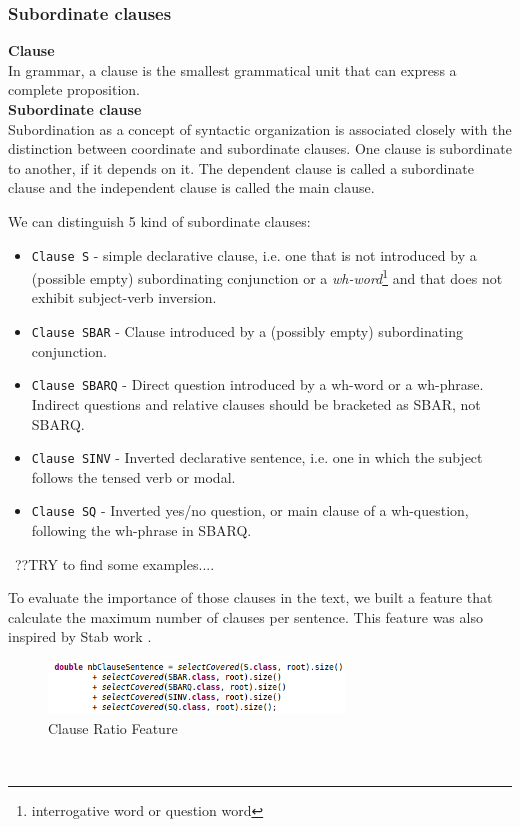 \subsubsection{Subordinate clauses}
\textbf{Clause}
\\
In grammar, a clause is the smallest grammatical unit that can express a complete proposition. 
\\
\textbf{Subordinate clause}
\\
Subordination as a concept of syntactic organization is associated closely with the distinction between coordinate and subordinate clauses. One clause is subordinate to another, if it depends on it. The dependent clause is called a subordinate clause and the independent clause is called the main clause.

We can distinguish 5 kind of subordinate clauses:
\begin{itemize}
  \item \texttt{Clause S} - simple declarative clause, i.e. one that is not introduced by a (possible empty) subordinating conjunction or a \emph{wh-word}\footnote{interrogative word or question word} and that does not exhibit subject-verb inversion.
  \item \texttt{Clause SBAR} - Clause introduced by a (possibly empty) subordinating conjunction.
  \item \texttt{Clause SBARQ} - Direct question introduced by a wh-word or a wh-phrase. Indirect questions and relative clauses should be bracketed as SBAR, not SBARQ.
  \item \texttt{Clause SINV} - Inverted declarative sentence, i.e. one in which the subject follows the tensed verb or modal. 
  \item \texttt{Clause SQ} - Inverted yes/no question, or main clause of a wh-question, following the wh-phrase in SBARQ.
\end{itemize} 
\
??TRY to find some examples....

To evaluate the importance of those clauses in the text, we built a feature that calculate the maximum number of clauses per sentence. This feature was also inspired by Stab work \cite{TUD-CS-2014-0882}.
\
\begin{figure}[H]
    \centering
    \includegraphics[width=0.7\textwidth]{fig/subclause.png}
    \caption[Short caption]{Clause Ratio Feature}
    \label{fig:subclause}
\end{figure}
\

